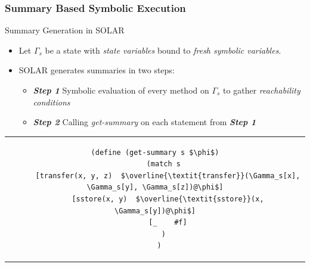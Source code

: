 \documentclass{beamer}
\newcommand{\boldIt}[1]{\textbf{\textit{#1}}}
\newcommand{\transfer}{\overline{\textit{transfer}}}
\newcommand{\sstore}{\overline{\textit{sstore}}}
\begin{document}
\begin{frame}[fragile]
  \frametitle{Summary Based Symbolic Execution}
  \begin{block}{Summary Generation in SOLAR}
  \begin{itemize}
    \item Let $\Gamma_s$ be a state with \textit{state variables} bound to
      \textit{fresh symbolic variables}.
    \item SOLAR generates summaries in two steps:
      \begin{itemize}
        \item \boldIt{Step 1} Symbolic evaluation of every method on $\Gamma_s$
          to gather \textit{reachability conditions}
        \item \boldIt{Step 2} Calling \textit{get-summary} on each statement
          from \boldIt{Step 1}
      \end{itemize}
  \end{itemize}
  \begin{center}
  \begin{tabular}{c}
  \begin{lstlisting}[language=Racket, numbers=none, basicstyle=\scriptsize]
  (define (get-summary s $\phi$)
    (match s
      [transfer(x, y, z)  $\transfer(\Gamma_s[x], \Gamma_s[y], \Gamma_s[z])@\phi$]
      [sstore(x, y)  $\sstore(x, \Gamma_s[y])@\phi$]
      [_    #f]
    )
  )
  \end{lstlisting}
  \end{tabular}
  \end{center}
  \end{block}
\end{frame}
\end{document}
